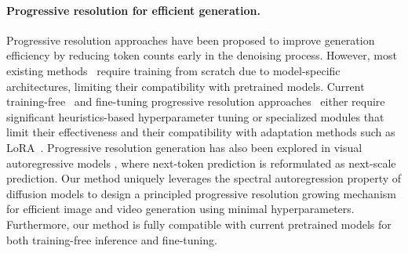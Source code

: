 

\vspace{-3pt}
\paragraph{Progressive resolution for efficient generation.} 
Progressive resolution approaches have been proposed to improve generation efficiency by reducing token counts early in the denoising process.
However, most existing methods~\cite{cdm, jing2022subspace, edifyimage, relaydiff, pyrflow, matryoshka, pyrdiff, cogview3, scalespace} require training from scratch due to model-specific architectures, limiting their compatibility with pretrained models. Current training-free~\cite{bottleneck, ralu, demofusion, fresco, freescale} and fine-tuning progressive resolution approaches~\cite{selfcascade, lssgen} either require significant heuristics-based hyperparameter tuning or specialized modules that limit their effectiveness and their compatibility with adaptation methods such as LoRA~\cite{hu2021lora}. Progressive resolution generation has also been explored in visual autoregressive models \cite{var, infinity, flowar, huang2025spectralar}, where next-token prediction is reformulated as next-scale prediction. Our method uniquely leverages the spectral autoregression property of diffusion models to design a principled progressive resolution growing mechanism for efficient image and video generation using minimal hyperparameters. Furthermore, our method is fully compatible with current pretrained models for both training-free inference and fine-tuning. 



